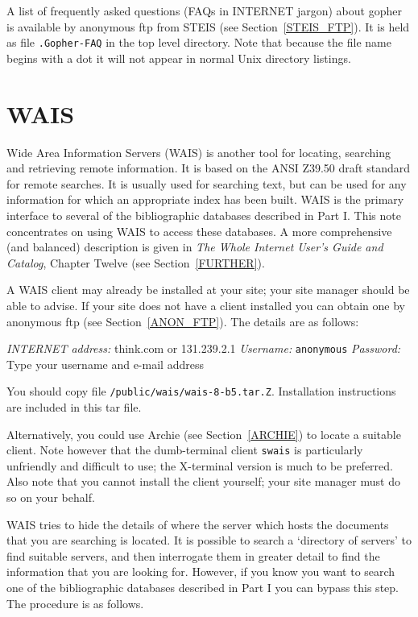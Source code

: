 \documentclass[twoside,11pt,nolof]{starlink}
\begin{document}
A list of frequently asked questions (FAQs in INTERNET jargon) about
gopher is available by anonymous ftp from STEIS (see
Section~\ref{STEIS_FTP}). It is held as file \texttt{.Gopher-FAQ} in the
top level directory. Note that because the file name begins with a dot
it will not appear in normal Unix directory listings.


\section{WAIS
\label{WAIS}}

Wide Area Information Servers (WAIS) is another tool for locating,
searching and retrieving remote information. It is based on the ANSI
Z39.50 draft standard for remote searches. It is usually used for
searching text, but can be used for any information for which an
appropriate index has been built. WAIS is the primary interface to
several of the bibliographic databases described in Part I. This note
concentrates on using WAIS to access these databases. A more
comprehensive (and balanced) description is given in \textit{The Whole
Internet User's Guide and Catalog}, Chapter Twelve (see
Section~\ref{FURTHER}).

A WAIS client may already be installed at your site; your site manager
should be able to advise. If your site does not have a client installed
you can obtain one by anonymous ftp (see Section~\ref{ANON_FTP}). The
details are as follows:

\textit{INTERNET address:} think.com or 131.239.2.1
\newline \textit{Username:} \verb-anonymous-
\newline \textit{Password:} Type your username and e-mail address

You should copy file \texttt{/public/wais/wais-8-b5.tar.Z}. Installation
instructions are included in this tar file.

Alternatively, you could use Archie (see Section~\ref{ARCHIE}) to locate
a suitable client. Note however that the dumb-terminal client \texttt{swais} is particularly unfriendly and difficult to use; the X-terminal
version is much to be preferred. Also note that you cannot install the
client yourself; your site manager must do so on your behalf.

WAIS tries to hide the details of where the server which hosts the
documents that you are searching is located. It is possible to search
a `directory of servers' to find suitable servers, and then interrogate
them in greater detail to find the information that you are looking for.
However, if you know you want to search one of the bibliographic
databases described in Part I you can bypass this step. The procedure
is as follows.
\end{document}
